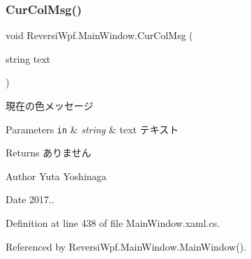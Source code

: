 \subsubsection{\texorpdfstring{Cur\+Col\+Msg()}{CurColMsg()}}
{\footnotesize\ttfamily void Reversi\+Wpf.\+Main\+Window.\+Cur\+Col\+Msg (\begin{DoxyParamCaption}\item[{string}]{text }\end{DoxyParamCaption})}



現在の色メッセージ 


\begin{DoxyParams}[1]{Parameters}
\mbox{\tt in}  & {\em string} & text テキスト \\
\hline
\end{DoxyParams}
\begin{DoxyReturn}{Returns}
ありません 
\end{DoxyReturn}
\begin{DoxyAuthor}{Author}
Yuta Yoshinaga 
\end{DoxyAuthor}
\begin{DoxyDate}{Date}
2017.. 
\end{DoxyDate}


Definition at line 438 of file Main\+Window.\+xaml.\+cs.



Referenced by Reversi\+Wpf.\+Main\+Window.\+Main\+Window().

